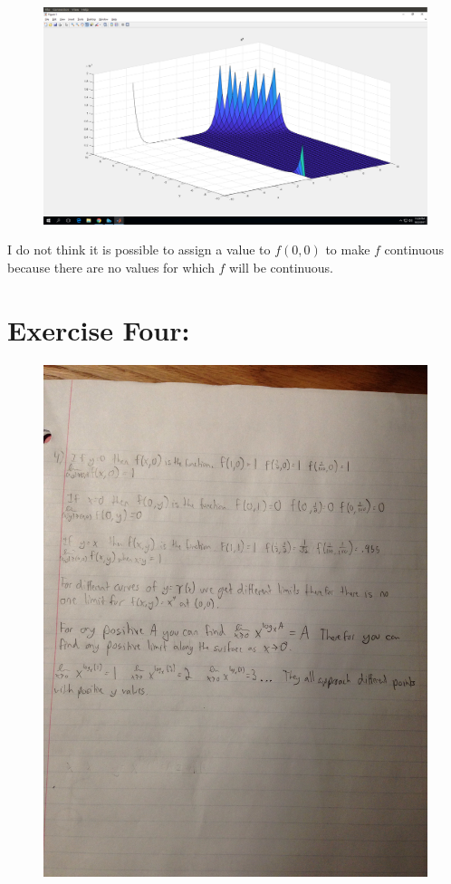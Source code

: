 \documentclass[11pt]{article}
\begin{document}
\begin{figure}[H]
	\centering
	\includegraphics[width=\textwidth]{PartThree_2.png}
\end{figure}

I do not think it is possible to assign a value to $f(0,0)$ to make $f$ continuous because there are no values for which $f$ will be continuous.

\section*{Exercise Four:}
\begin{figure}[H]
	\centering
	\includegraphics[width=\textwidth]{PartFour}
\end{figure}
\end{document}
